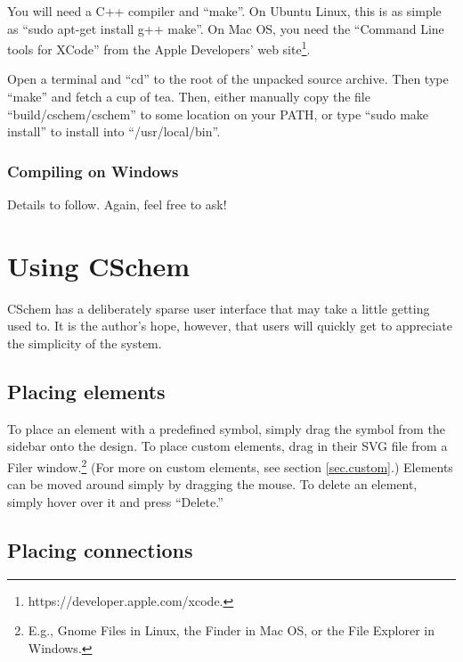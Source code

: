 \documentclass[11pt]{report}
\begin{document}
You will need a C++ compiler and ``make''. On Ubuntu Linux, this is as simple
as ``sudo apt-get install g++ make''. On Mac OS, you need the
``Command Line tools for XCode'' from the Apple Developers' web
site\footnote{https://developer.apple.com/xcode.}.

Open a terminal and ``cd'' to the root of the unpacked source
archive. Then type ``make'' and fetch a cup of tea. Then, either
manually copy the file ``build/cschem/cschem'' to some location on your PATH, or type ``sudo make
install'' to install into ``/usr/local/bin''.

\subsection{Compiling on Windows}

Details to follow. Again, feel free to ask!
% 

\chapter{Using CSchem}

CSchem has a deliberately sparse user interface that may take a little
getting used to. It is the author's hope, however, that users will
quickly get to appreciate the simplicity of the system.

\section{Placing elements}

To place an element with a predefined symbol, simply drag the symbol
from the sidebar onto the design. To place custom elements, drag in
their SVG file from a Filer window.\footnote{E.g., Gnome Files in
  Linux, the Finder in Mac OS, or the File Explorer in Windows.} (For
more on custom elements, see section \ref{sec.custom}.) Elements can be moved around simply by dragging the mouse. To
delete an element, simply hover over it and press ``Delete.''

\section{Placing connections}
\end{document}
